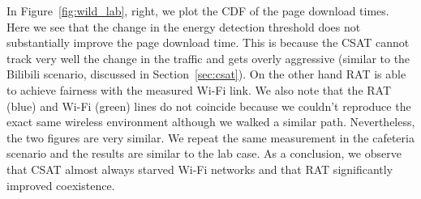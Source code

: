 In Figure~\ref{fig:wild_lab}, right, we plot the CDF of the page download times. Here we see that the change in the energy detection threshold does not substantially improve the page download time. 
This is because the CSAT cannot track very well the change in the traffic and gets overly aggressive (similar to the Bilibili scenario, discussed in Section~\ref{sec:csat}). On the other hand RAT is able to achieve fairness with the measured Wi-Fi link. 
We also note that the RAT (blue) and Wi-Fi (green) lines do not coincide because we couldn't reproduce the exact same wireless environment although we walked a similar path. 
Nevertheless, the two figures are very similar.
We repeat the same measurement in the cafeteria scenario and 
the results are similar to the lab case. 
As a conclusion, we observe that CSAT almost always starved Wi-Fi networks and that RAT significantly improved coexistence. 





